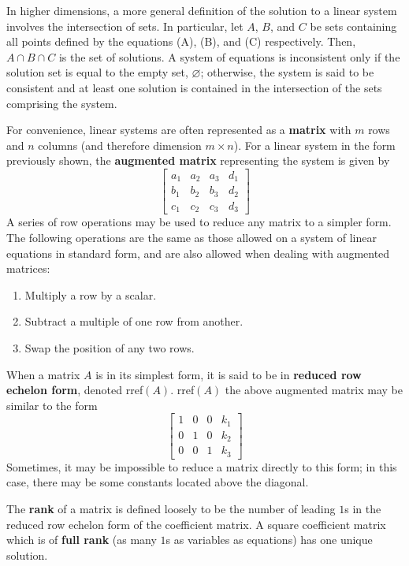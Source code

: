In higher dimensions, a more general definition of the solution to a linear system involves the intersection of sets. In particular, let $A$, $B$, and $C$ be sets containing all points defined by the equations (A), (B), and (C) respectively. Then, $A\cap B\cap C$ is the set of solutions. A system of equations is inconsistent only if the solution set is equal to the empty set, $\varnothing$; otherwise, the system is said to be consistent and at least one solution is contained in the intersection of the sets comprising the system.

For convenience, linear systems are often represented as a \textbf{matrix} with $m$ rows and $n$ columns (and therefore dimension $m\times n$). For a linear system in the form previously shown, the \textbf{augmented matrix} representing the system is given by
\[\left[\begin{array}{ccc|c}
    a_1 & a_2 & a_3 & d_1\\
    b_1 & b_2 & b_3 & d_2\\
    c_1 & c_2 & c_3 & d_3
\end{array}\right]\]
A series of row operations may be used to reduce any matrix to a simpler form. The following operations are the same as those allowed on a system of linear equations in standard form, and are also allowed when dealing with augmented matrices:
\begin{enumerate}
    \item Multiply a row by a scalar.
    \item Subtract a multiple of one row from another.
    \item Swap the position of any two rows.
\end{enumerate}
When a matrix $A$ is in its simplest form, it is said to be in \textbf{reduced row echelon form}, denoted rref$(A)$. rref$(A)$ the above augmented matrix may be similar to the form \[\left[\begin{array}{ccc|c}
    1 & 0 & 0 & k_1\\
    0 & 1 & 0 & k_2\\
    0 & 0 & 1 & k_3
\end{array}\right]\]
Sometimes, it may be impossible to reduce a matrix directly to this form; in this case, there may be some constants located above the diagonal.

The \textbf{rank} of a matrix is defined loosely to be the number of leading $1$s in the reduced row echelon form of the coefficient matrix. A square coefficient matrix which is of \textbf{full rank} (as many $1$s as variables as equations) has one unique solution. 

